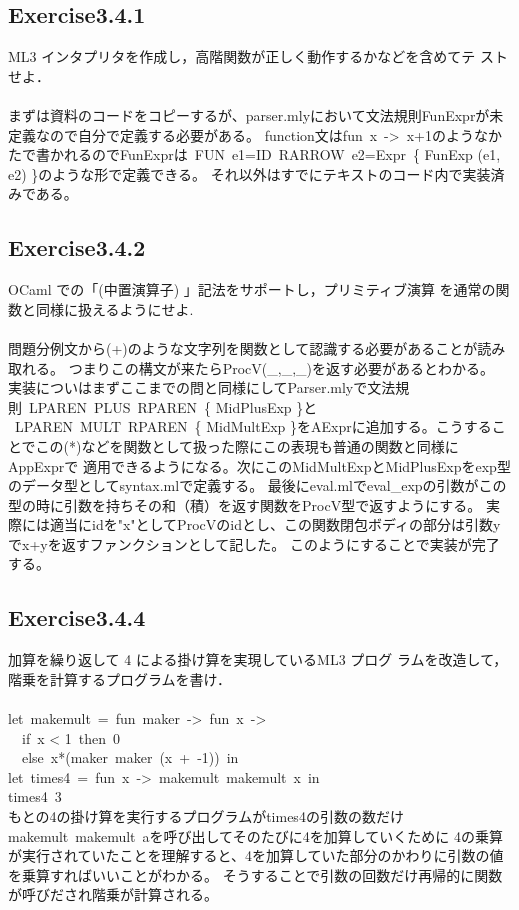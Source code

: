 \documentclass[a4paper,11pt,oneside,openany]{jsarticle}
\begin{document}
\subsection{Exercise3.4.1}
    ML3 インタプリタを作成し，高階関数が正しく動作するかなどを含めてテ ストせよ．\\\\
    まずは資料のコードをコピーするが、parser.mlyにおいて文法規則FunExprが未定義なので自分で定義する必要がある。
    function文はfun\ x\ ->\ x+1のようなかたで書かれるのでFunExprは\ FUN\ e1=ID\ RARROW\ e2=Expr\ \{ FunExp (e1, e2) \}のような形で定義できる。
    それ以外はすでにテキストのコード内で実装済みである。

\subsection{Exercise3.4.2}
    OCaml での「(中置演算子) 」記法をサポートし，プリミティブ演算 を通常の関数と同様に扱えるようにせよ.\\\\
    問題分例文から(+)のような文字列を関数として認識する必要があることが読み取れる。
    つまりこの構文が来たらProcV(\_,\_,\_)を返す必要があるとわかる。
    実装についはまずここまでの問と同様にしてParser.mlyで文法規則\ LPAREN\ PLUS\ RPAREN\  \{ MidPlusExp \}と
    \ LPAREN\ MULT\ RPAREN\  \{ MidMultExp \}をAExprに追加する。こうすることでこの(*)などを関数として扱った際にこの表現も普通の関数と同様にAppExprで
    適用できるようになる。次にこのMidMultExpとMidPlusExpをexp型のデータ型としてsyntax.mlで定義する。
    最後にeval.mlでeval\_expの引数がこの型の時に引数を持ちその和（積）を返す関数をProcV型で返すようにする。
    実際には適当にidを"x"としてProcVのidとし、この関数閉包ボディの部分は引数yでx+yを返すファンクションとして記した。
    このようにすることで実装が完了する。

\subsection{Exercise3.4.4}
    加算を繰り返して 4 による掛け算を実現しているML3 プログ ラムを改造して，階乗を計算するプログラムを書け．\\\\
    let\ makemult\ =\ fun\ maker\ ->\ fun\ x\ ->\\
    \ \ if\ x < 1\ then\ 0 \\
    \ \ else\ x*(maker\ maker\ (x\ +\ -1))\ in\\
    let\ times4\ =\ fun\ x\ ->\ makemult\ makemult\ x\ in\\
    times4\ 3\\
    もとの4の掛け算を実行するプログラムがtimes4の引数の数だけmakemult\ makemult\ aを呼び出してそのたびに4を加算していくために
    4の乗算が実行されていたことを理解すると、4を加算していた部分のかわりに引数の値を乗算すればいいことがわかる。
    そうすることで引数の回数だけ再帰的に関数が呼びだされ階乗が計算される。
\end{document}
